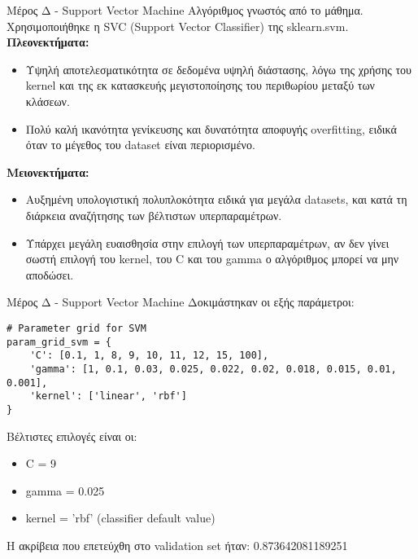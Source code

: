 \documentclass{beamer}
\begin{document}
\begin{frame}[fragile]{Μέρος Δ - Support Vector Machine}
Αλγόριθμος γνωστός από το μάθημα. Χρησιμοποιήθηκε η  SVC (Support Vector Classifier) της sklearn.svm. \\
\textbf{Πλεονεκτήματα:}
\begin{itemize}
    \item Υψηλή αποτελεσματικότητα σε δεδομένα υψηλή διάστασης, λόγω της χρήσης του kernel και της εκ κατασκευής μεγιστοποίησης του περιθωρίου μεταξύ των κλάσεων.
    \item Πολύ καλή ικανότητα γενίκευσης και δυνατότητα αποφυγής overfitting, ειδικά όταν το μέγεθος του dataset είναι περιορισμένο.
\end{itemize}
\textbf{Μειονεκτήματα:}
\begin{itemize}
    \item Αυξημένη υπολογιστική πολυπλοκότητα ειδικά για μεγάλα datasets, και κατά τη διάρκεια αναζήτησης των βέλτιστων υπερπαραμέτρων.
    \item Υπάρχει μεγάλη ευαισθησία στην επιλογή των υπερπαραμέτρων, αν δεν γίνει σωστή επιλογή του kernel, του C και του gamma ο αλγόριθμος μπορεί να μην αποδώσει.
\end{itemize}
\end{frame}
\begin{frame}[fragile]{Μέρος Δ - Support Vector Machine}
Δοκιμάστηκαν οι εξής παράμετροι:
\lstset{style=python}
\begin{lstlisting}
# Parameter grid for SVM
param_grid_svm = {
    'C': [0.1, 1, 8, 9, 10, 11, 12, 15, 100],
    'gamma': [1, 0.1, 0.03, 0.025, 0.022, 0.02, 0.018, 0.015, 0.01, 0.001],
    'kernel': ['linear', 'rbf']
}
\end{lstlisting}

Βέλτιστες επιλογές είναι οι:
\begin{itemize}
    \item C = 9
    \item gamma = 0.025
    \item kernel = 'rbf' (classifier default value)
\end{itemize}
Η ακρίβεια που επετεύχθη στο validation set ήταν: 0.873642081189251
\end{frame}
\end{document}
